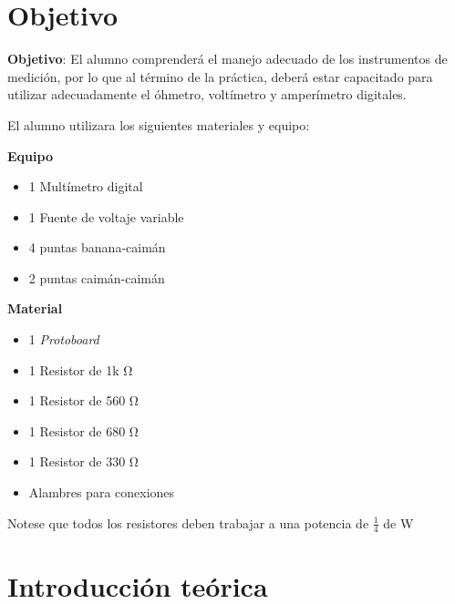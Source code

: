 \documentclass[a4paper,12pt]{article}
\begin{document}
\newpage

\tableofcontents

\newpage



\section*{Objetivo}

\textbf{Objetivo}: El alumno comprenderá el manejo adecuado de los instrumentos de medición, por lo que al término de la práctica, deberá estar capacitado para utilizar adecuadamente el óhmetro, voltímetro y amperímetro digitales.\par

El alumno utilizara los siguientes materiales y equipo:
\vspace{.5cm}
\begin{multicols}{2}
\textbf{Equipo}\\
\begin{itemize}
	\item 1 Multímetro digital
	\item 1 Fuente de voltaje variable
	\item 4 puntas banana-caimán
	\item 2 puntas caimán-caimán
\end{itemize}

\columnbreak

\textbf{Material}\\
\begin{itemize}
	\item 1 \textit{Protoboard}
	\item 1 Resistor de 1k \si{\ohm}
	\item 1 Resistor de 560 \si{\ohm}
	\item 1 Resistor de 680 \si{\ohm}
	\item 1 Resistor de 330 \si{\ohm}
	\item Alambres para conexiones
\end{itemize}

\end{multicols}

Notese que todos los resistores deben trabajar a una potencia de $\frac{1}{4}$ de \si{\watt}

\vspace{1cm}

\section{Introducción teórica}
\end{document}
